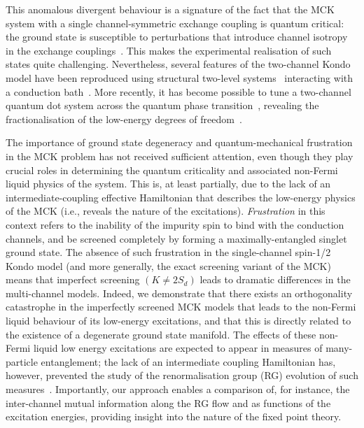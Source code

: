 \documentclass[reprint,prb,superscriptaddress]{revtex4-2}
\begin{document}
This anomalous divergent behaviour is a signature of the fact that the MCK system with a single channel-symmetric exchange coupling is quantum critical: the ground state is susceptible to perturbations that introduce channel isotropy in the exchange couplings~\cite{Noz_blandin_1980,andrei_jerez_1995,affleck_pang_cox_1992,zarand_2000,zheng_2021}. This makes the experimental realisation of such states quite challenging.
Nevertheless, several features of the two-channel Kondo model have been reproduced using structural two-level systems~\cite{zawadowski_1980,vladar_1983} interacting with a conduction bath~\cite{cichorek_2005,ralph_buhrman_1992,ralph_ludwig_1994,Iftikhar2015,Zhu2016}.
More recently, it has become possible to tune a two-channel quantum dot system across the quantum phase transition~\cite{Potok2007,Keller2015}, revealing the fractionalisation of the low-energy degrees of freedom~\cite{emery1995,Coleman_tsvelik,mebrahtu_2013}.

The importance of ground state degeneracy and quantum-mechanical frustration in the MCK problem has not received sufficient attention, even though they play crucial roles in determining the quantum criticality and associated non-Fermi liquid physics of the system. This is, at least partially, due to the lack of an intermediate-coupling effective Hamiltonian that describes the low-energy physics of the MCK (i.e., reveals the nature of the excitations). \textit{Frustration} in this context refers to the inability of the impurity spin to bind with the conduction channels, and be screened completely by forming a maximally-entangled singlet ground state. The absence of such frustration in the single-channel spin-1/2 Kondo model (and more generally, the exact screening variant of the MCK) means that imperfect screening \((K \neq 2S_d)\) leads to dramatic differences in the multi-channel models. Indeed, we demonstrate that there exists an orthogonality catastrophe in the imperfectly screened MCK models that leads to the non-Fermi liquid behaviour of its low-energy excitations, and that this is directly related to the existence of a degenerate ground state manifold. The effects of these non-Fermi liquid low energy excitations are expected to appear in measures of many-particle entanglement; the lack of an intermediate coupling Hamiltonian has, however, prevented the study of the renormalisation group (RG) evolution of such measures~\cite{alkurtass_affleck_2016,kim_shim_2021}. 
Importantly, our approach enables a comparison of, for instance, the inter-channel mutual information along the RG flow and as functions of the excitation energies, providing insight into the nature of the fixed point theory.
\end{document}
